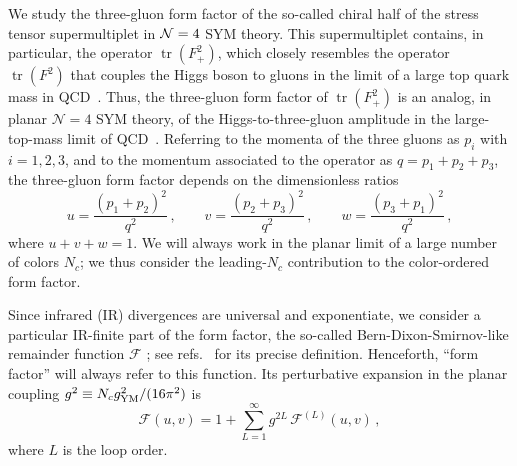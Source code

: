 \documentclass[12pt]{article}
\DeclareMathOperator{\tr}{tr}
\begin{document}
We study the three-gluon form factor of the so-called chiral half of the stress tensor supermultiplet in ${\cal N}=4$ SYM theory. This supermultiplet contains, in particular, the operator $\tr(F_+^2)$, which closely resembles the operator $\tr(F^2)$ 
that couples the Higgs boson to gluons in the limit of a large top quark mass in QCD~\citep{Wilczek:1977zn,Shifman:1978zn}.  Thus, the three-gluon form factor of $\tr(F_+^2)$ is an analog, in planar $\mathcal{N}=4$ SYM theory, of the Higgs-to-three-gluon amplitude in the large-top-mass limit of QCD~\citep{Gehrmann:2011aa,Brandhuber:2012vm}.  Referring to the momenta of the three gluons as $p_i$ with $i=1,2,3$, and to the momentum associated to the operator as $q=p_1+p_2+p_3$, the three-gluon form factor depends on the dimensionless ratios
\begin{equation}
    \label{eq: definition u,v,w}
    u=\frac{(p_1+p_2)^2}{q^2}\,,\qquad v=\frac{(p_2+p_3)^2}{q^2}\,,\qquad w=\frac{(p_3+p_1)^2}{q^2}\,,
\end{equation}
where $u+v+w=1$.
We will always work in the planar limit of a large number of colors $N_c$; we thus consider the leading-$N_c$ contribution to the color-ordered form factor.

Since infrared (IR) divergences are universal and exponentiate, we consider a particular IR-finite part of the form factor, the so-called Bern-Dixon-Smirnov-like remainder function $\mathcal{F}$ \citep{Bern:2005iz}; see refs.~\citep{Brandhuber:2012vm,Dixon:2020bbt,Dixon:2022rse} for its precise definition.  Henceforth, ``form factor'' will always refer to this function.  Its perturbative expansion in the planar coupling $g^2 \equiv N_c g_{\rm YM}^2/(16\pi^2)$ is 
\begin{equation}
    \mathcal{F}(u,v) = 1 + \sum_{L=1}^\infty g^{2L} \, \mathcal{F}^{(L)}(u,v) \,,
\end{equation}
where $L$ is the loop order.
\end{document}
